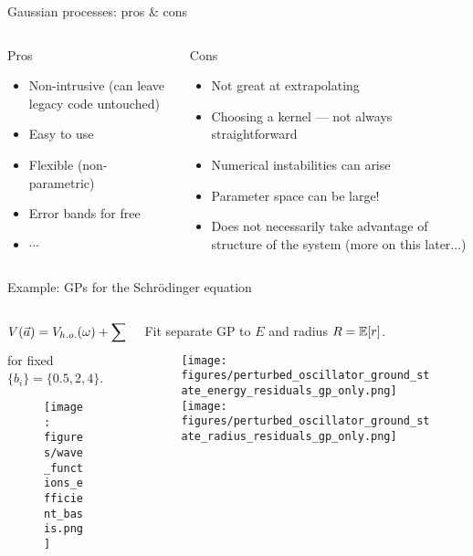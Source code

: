 \documentclass[xcolor=dvipsnames, aspectratio=169]{beamer}
\begin{document}
\begin{frame}{Gaussian processes: pros \& cons}

\begin{columns}[t]
\begin{column}{0.5\textwidth}
\begin{myblock}[valign=center]{Pros}
\setlength\leftmargini{0pt}
\begin{itemize}
\item Non-intrusive (can leave legacy code untouched)
\item Easy to use
\item Flexible (non-parametric)
\item Error bands for free
\item $\cdots$
\end{itemize}
\end{myblock}
\end{column}
\begin{column}{0.5\textwidth}
\begin{myblock}[valign=center]{Cons}
\setlength\leftmargini{0pt}
\begin{itemize}
\item Not great at extrapolating
\item Choosing a kernel --- not always straightforward
\item Numerical instabilities can arise
\item Parameter space can be large!
\item Does not necessarily take advantage of structure of the system (more on this later...)
\end{itemize}
\end{myblock}
\end{column}
\end{columns}
\end{frame}


\begin{frame}[t]{Example: GPs for the Schr\"odinger equation}
\begin{columns}[t]
\begin{column}{0.5\textwidth}
\vspace{-0.5cm}%
\begin{align*}
    V(\vec{a}) = V_{h.o.}(\omega) + \sum a_i \exp[-(r/b_i)^2]
\end{align*}
for fixed $\{b_i\} = \{0.5, 2, 4\}$.
\vspace{-0.1cm}
\begin{figure}
\texttt{[image: figures/wave\_functions\_efficient\_basis.png]}
\end{figure}
\end{column}
\begin{column}{0.5\textwidth}
Fit separate GP to $E$ and radius $R=\operatorname{\mathbb{E}}[r]$.
\begin{figure}
\texttt{[image: figures/perturbed\_oscillator\_ground\_state\_energy\_residuals\_gp\_only.png]}
\texttt{[image: figures/perturbed\_oscillator\_ground\_state\_radius\_residuals\_gp\_only.png]}
\end{figure}
\end{column}
\end{columns}
\end{frame}
\end{document}
